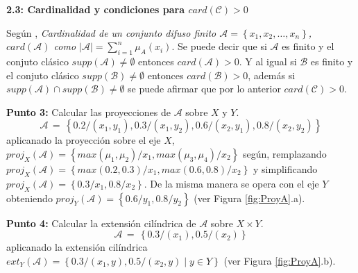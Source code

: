 \documentclass[10pt,onecolumn,twoside,letterpaper]{article}
\begin{document}
\par{\bf 2.3: Cardinalidad y condiciones para $card(\mathcal{C})>0$}\\
\par Seg\'un \cite{Babuska1999}, \emph{Cardinalidad de un conjunto difuso finito $\mathcal{A}=\left\{x_1,x_2,\ldots,x_n\right\}$, $card(\mathcal{A})$ como $\left|\mathcal{A}\right|=\sum_{i=1}^n\mu_A(x_i)$}. Se puede decir que si $\mathcal{A}$ es finito y el conjuto cl\'asico $supp(\mathcal{A})\neq\emptyset$ entonces $card(\mathcal{A})>0$. Y al igual si $\mathcal{B}$ es finito y el conjuto cl\'asico $supp(\mathcal{B})\neq\emptyset$ entonces $card(\mathcal{B})>0$, adem\'as si $supp(\mathcal{A})\cap supp(\mathcal{B})\neq\emptyset$ se puede afirmar que por lo anterior $card(\mathcal{C})>0$.
\par{\bf \large Punto 3:} Calcular las proyecciones de $\mathcal{A}$ sobre $X$ y $Y$.
\begin{equation}
  \label{eq:ej3}
  \mathcal{A}\,=\,\left\{0.2/(x_1,y_1),0.3/(x_1,y_2),0.6/(x_2,y_1),0.8/(x_2,y_2)\right\}
\end{equation}
aplicanado la proyecci\'on sobre el eje $X$, $proj_X(\mathcal{A})=\left\{max(\mu_1,\mu_2)/x_1,max(\mu_3,\mu_4)/x_2\right\}$ seg\'un\cite{Babuska1999}, remplazando $proj_X(\mathcal{A})=\left\{max(0.2,0.3)/x_1,max(0.6,0.8)/x_2\right\}$ y simplificando $proj_X(\mathcal{A})=\left\{0.3/x_1,0.8/x_2\right\}$. De la misma manera se opera con el eje $Y$ obteniendo $proj_Y(\mathcal{A})=\left\{0.6/y_1,0.8/y_2\right\}$  (ver Figura \ref{fig:ProyA}.a).
\par{\bf \large Punto 4:} Calcular la extensi\'on cil\'indrica de $\mathcal{A}$ sobre $X\times Y$.
\begin{equation}
  \label{eq:ej3}
  \mathcal{A}\,=\,\left\{0.3/(x_1),0.5/(x_2)\right\}
\end{equation}
aplicanado la extensi\'on cil\'indrica $ext_Y(\mathcal{A})=\left\{0.3/(x_1,y),0.5/(x_2,y)\mid y\in Y\right\}$ (ver Figura \ref{fig:ProyA}.b).
\end{document}
